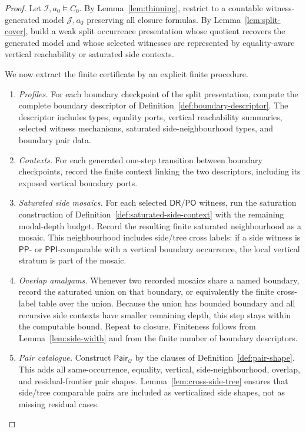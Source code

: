 \documentclass[11pt]{article}
\newcommand{\DR}{\mathsf{DR}}
\newcommand{\PO}{\mathsf{PO}}
\newcommand{\PP}{\mathsf{PP}}
\newcommand{\PPI}{\mathsf{PPI}}
\newcommand{\I}{\mathcal I}
\newcommand{\J}{\mathcal J}
\newcommand{\Q}{\mathcal Q}
\newcommand{\Pair}{\mathsf{Pair}}
\begin{document}
\begin{proof}
Let $\I,a_0\models C_0$.  By Lemma~\ref{lem:thinning}, restrict to a countable witness-generated model $\J,a_0$ preserving all closure formulas.  By Lemma~\ref{lem:split-cover}, build a weak split occurrence presentation whose quotient recovers the generated model and whose selected witnesses are represented by equality-aware vertical reachability or saturated side contexts.

We now extract the finite certificate by an explicit finite procedure.
\begin{enumerate}[label=(E\arabic*)]
\item \emph{Profiles.}  For each boundary checkpoint of the split presentation, compute the complete boundary descriptor of Definition~\ref{def:boundary-descriptor}.  The descriptor includes types, equality ports, vertical reachability summaries, selected witness mechanisms, saturated side-neighbourhood types, and boundary pair data.
\item \emph{Contexts.}  For each generated one-step transition between boundary checkpoints, record the finite context linking the two descriptors, including its exposed vertical boundary ports.
\item \emph{Saturated side mosaics.}  For each selected $\DR/\PO$ witness, run the saturation construction of Definition~\ref{def:saturated-side-context} with the remaining modal-depth budget.  Record the resulting finite saturated neighbourhood as a mosaic.  This neighbourhood includes side/tree cross labels: if a side witness is $\PP$- or $\PPI$-comparable with a vertical boundary occurrence, the local vertical stratum is part of the mosaic.
\item \emph{Overlap amalgams.}  Whenever two recorded mosaics share a named boundary, record the saturated union on that boundary, or equivalently the finite cross-label table over the union.  Because the union has bounded boundary and all recursive side contexts have smaller remaining depth, this step stays within the computable bound.  Repeat to closure.  Finiteness follows from Lemma~\ref{lem:side-width} and from the finite number of boundary descriptors.
\item \emph{Pair catalogue.}  Construct $\Pair_\Q$ by the clauses of Definition~\ref{def:pair-shape}.  This adds all same-occurrence, equality, vertical, side-neighbourhood, overlap, and residual-frontier pair shapes.  Lemma~\ref{lem:cross-side-tree} ensures that side/tree comparable pairs are included as verticalized side shapes, not as missing residual cases.

\end{enumerate}
\end{proof}
\end{document}
